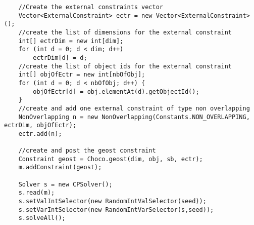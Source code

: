 \begin{lstlisting}
	//Create the external constraints vector                                                 
	Vector<ExternalConstraint> ectr = new Vector<ExternalConstraint>();                     
	//create the list of dimensions for the external constraint                              
	int[] ectrDim = new int[dim];                                                      
	for (int d = 0; d < dim; d++)                                                              
	    ectrDim[d] = d;                                                                     
	//create the list of object ids for the external constraint                              
	int[] objOfEctr = new int[nbOfObj];                                                     
	for (int d = 0; d < nbOfObj; d++) {                                                      
	    objOfEctr[d] = obj.elementAt(d).getObjectId();                                     
	}                                                                                        
	//create and add one external constraint of type non overlapping                                 
	NonOverlapping n = new NonOverlapping(Constants.NON_OVERLAPPING, ectrDim, objOfEctr); 
	ectr.add(n);                                                                           
	                                                                                         
	//create and post the geost constraint
	Constraint geost = Choco.geost(dim, obj, sb, ectr);
	m.addConstraint(geost);

	Solver s = new CPSolver();                                                               
	s.read(m);                                                                               
	s.setValIntSelector(new RandomIntValSelector(seed));                                     
	s.setVarIntSelector(new RandomIntVarSelector(s,seed));                                  
	s.solveAll();
\end{lstlisting} 
